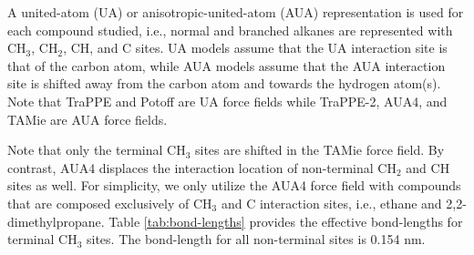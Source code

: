 \documentclass[preprint,review,12pt]{elsarticle}
\begin{document}
	A united-atom (UA) or anisotropic-united-atom (AUA) representation is used for each compound studied, i.e., normal and branched alkanes are represented with CH$_3$, CH$_2$, CH, and C sites. UA models assume that the UA interaction site is that of the carbon atom, while AUA models assume that the AUA interaction site is shifted away from the carbon atom and towards the hydrogen atom(s). Note that TraPPE and Potoff are UA force fields while TraPPE-2, AUA4, and TAMie are AUA force fields. 
	
	
	Note that only the terminal CH$_3$ sites are shifted in the TAMie force field. By contrast, AUA4 displaces the interaction location of non-terminal CH$_2$ and CH sites as well. For simplicity, we only utilize the AUA4 force field with compounds that are composed exclusively of CH$_3$ and C interaction sites, i.e., ethane and 2,2-dimethylpropane. Table \ref{tab:bond-lengths} provides the effective bond-lengths for terminal CH$_3$ sites. The bond-length for all non-terminal sites is 0.154 nm.
	
\end{document}
